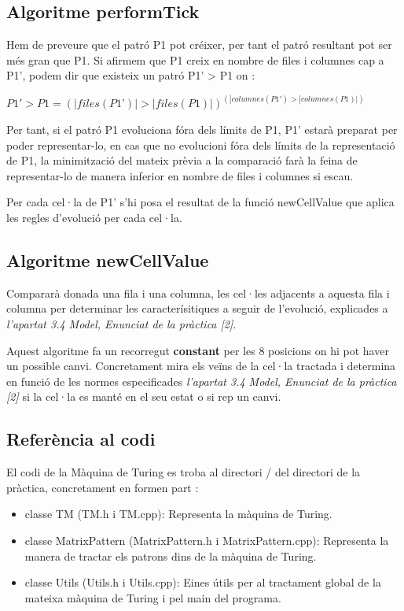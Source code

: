 \documentclass[12pt,a4paper]{report}
\begin{document}
\subsection{Algoritme performTick}

Hem de preveure que el patró P1 pot créixer, per tant el patró resultant pot ser més gran que P1. Si afirmem que P1 creix en nombre de files i columnes cap a P1', podem dir que existeix un patró P1’ > P1 on :

\begin{center}
$P1' > P1 = (|files(P1’)|>|files(P1)|) ^ (|columnes(P1')>|columnes(P1)|)$
\end{center}

Per tant, si el patró P1 evoluciona fóra dels límits de P1, P1’ estarà preparat per poder representar-lo, en cas que no evolucioni fóra dels límits de la representació de P1, la minimització del mateix prèvia a la comparació farà la feina de representar-lo de manera inferior en nombre de files i columnes si escau.

Per cada cel·la de P1’ s’hi posa el resultat de la funció newCellValue que aplica les regles d’evolució per cada cel·la.

\subsection{Algoritme newCellValue}

Compararà donada una fila i una columna, les cel·les adjacents a aquesta fila i columna per determinar les caracterísitiques a seguir de l’evolució, explicades a \textit{l’apartat 3.4 Model, Enunciat de la pràctica [2]}.

Aquest algoritme fa un recorregut \textbf{constant} per les 8 posicions on hi pot haver un possible canvi. Concretament mira els veïns de la cel·la tractada i determina en funció de les normes especificades \textit{l’apartat 3.4 Model, Enunciat de la pràctica [2]} si la cel·la es manté en el seu estat o si rep un canvi.

\subsection{Referència al codi}

El codi de la Màquina de Turing es troba al directori / del directori de la pràctica, concretament en formen part :

\begin{itemize}
\item classe TM (TM.h i TM.cpp): Representa la màquina de Turing.
\item classe MatrixPattern (MatrixPattern.h i MatrixPattern.cpp): Representa la manera de tractar els patrons dins de la màquina de Turing.
\item classe Utils  (Utils.h i Utils.cpp): Eines útils per al tractament global de la mateixa màquina de Turing i pel main del programa.
\end{itemize}
\end{document}
